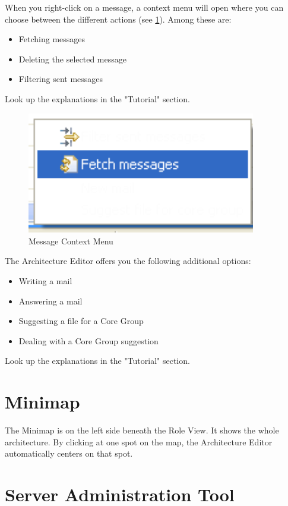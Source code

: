 When you right-click on a message, a context menu will open where you can choose 
between the different actions (see \ref{workflowkontext}). Among these are:

\begin{itemize}
	\item Fetching messages
	\item Deleting the selected message
	\item Filtering sent messages
\end{itemize}
Look up the explanations in the "Tutorial" section.

\begin{figure}[h!]
\begin{center}
\includegraphics[width=10cm]{workflowkontext.png}
   \caption{Message Context Menu}
\label{workflowkontext}
\end{center}
\end{figure}\par

The Architecture Editor offers you the following additional options:
\begin{itemize}
	\item Writing a mail
	\item Answering a mail
	\item Suggesting a file for a Core Group
	\item Dealing with a Core Group suggestion
\end{itemize}
Look up the explanations in the "Tutorial" section.

\section{Minimap}

The Minimap is on the left side beneath the Role View. It shows the whole architecture.
By clicking at one spot on the map, the Architecture Editor automatically centers on that
spot. 


\section{Server Administration Tool}

